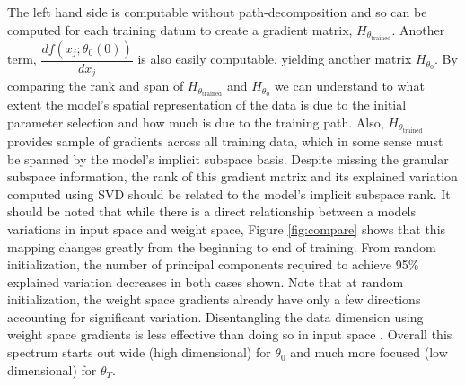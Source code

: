 The left hand side is computable without path-decomposition and so can be computed for each training datum to create a gradient matrix, $H_{\theta_\text{trained}}$. Another term, $\dfrac{df(x_j; \theta_0(0))}{dx_j}$ is also easily computable, yielding another matrix $H_{\theta_0}$. By comparing the rank and span of $H_{\theta_\text{trained}}$ and $H_{\theta_0}$ we can understand to what extent the model's spatial representation of the data is due to the initial parameter selection and how much is due to the training path. Also, $H_{\theta_\text{trained}}$ provides sample of gradients across all training data, which in some sense must be spanned by the model's implicit subspace basis. Despite missing the granular subspace information, the rank of this gradient matrix and its explained variation computed using SVD should be related to the model's implicit subspace rank. 
It should be noted that while there is a direct relationship between a models variations in input space and weight space, Figure \ref{fig:compare} shows that this mapping changes greatly from the beginning to end of training. From random initialization, the number of principal components required to achieve 95\% explained variation decreases in both cases shown. Note that at random initialization, the weight space gradients already have only a few directions accounting for significant variation. Disentangling the data dimension using weight space gradients is less effective than doing so in input space \citep{shamir2021dimpled}. Overall this spectrum starts out wide (high dimensional) for $\theta_0$ and much more focused (low dimensional) for $\theta_T$. 


%


